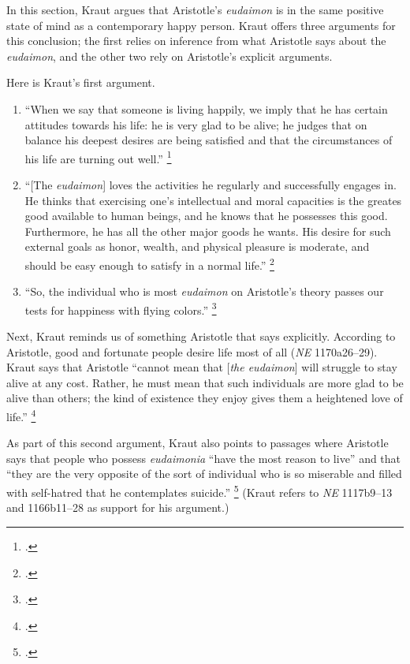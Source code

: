 \documentclass[12pt,letterpaper]{article}
\begin{document}
In this section, Kraut argues that Aristotle's \textit{eudaimon} is in the same positive state of mind as a contemporary happy person.
Kraut offers three arguments for this conclusion; the first relies on inference from what Aristotle says about the \textit{eudaimon}, and the other two rely on Aristotle's explicit arguments.

Here is Kraut's first argument.

\begin{enumerate}
    \item ``When we say that someone is living happily, we imply that he has certain attitudes towards his life: he is very glad to be alive; he judges that on balance his deepest desires are being satisfied and that the circumstances of his life are turning out well.''%
    \footcite[][170]{two-conceptions-of-happiness-kraut-1979}
    \item ``[The \textit{eudaimon}] loves the activities he regularly and successfully engages in.
        He thinks that exercising one's intellectual and moral capacities is the greates good available to human beings, and he knows that he possesses this good.
        Furthermore, he has all the other major goods he wants.
        His desire for such external goals as honor, wealth, and physical pleasure is moderate, and should be easy enough to satisfy in a normal life.''%
        \footcite[][170--171]{two-conceptions-of-happiness-kraut-1979}
    \item ``So, the individual who is most \textit{eudaimon} on Aristotle's theory passes our tests for happiness with flying colors.''%
        \footcite[][171]{two-conceptions-of-happiness-kraut-1979}
\end{enumerate}

Next, Kraut reminds us of something Aristotle that says explicitly.
According to Aristotle, good and fortunate people desire life most of all (\textit{NE} 1170a26--29).
Kraut says that Aristotle ``cannot mean that [\textit{the eudaimon}] will struggle to stay alive at any cost.
Rather, he must mean that such individuals are more glad to be alive than others; the kind of existence they enjoy gives them a heightened love of life.''%
\footcite[][1970]{two-conceptions-of-happiness-kraut-1979}

As part of this second argument, Kraut also points to passages where Aristotle says that people who possess \textit{eudaimonia} ``have the most reason to live'' and that ``they are the very opposite of the sort of individual who is so miserable and filled with self-hatred that he contemplates suicide.''
\footcite[][172]{two-conceptions-of-happiness-kraut-1979}
(Kraut refers to \textit{NE} 1117b9--13 and 1166b11--28 as support for his argument.)
\end{document}
